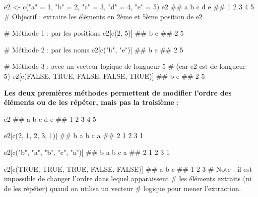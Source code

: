 \documentclass[12pt,twosided, notitlepage]{book}
\newenvironment{Shaded}{}{}
\newcommand{\KeywordTok}[1]{\textcolor[rgb]{0.00,0.00,1.00}{{#1}}}
\newcommand{\DecValTok}[1]{{#1}}
\newcommand{\StringTok}[1]{\textcolor[rgb]{0.00,0.50,0.50}{{#1}}}
\newcommand{\CommentTok}[1]{\textcolor[rgb]{0.00,0.50,0.00}{{#1}}}
\newcommand{\OtherTok}[1]{\textcolor[rgb]{1.00,0.25,0.00}{{#1}}}
\newcommand{\NormalTok}[1]{{#1}}
\renewenvironment{Shaded}{\begin{snugshade}}{\end{snugshade}}
\begin{document}
\begin{Shaded}
\begin{Highlighting}[]
\NormalTok{e2 <-}\StringTok{ }\KeywordTok{c}\NormalTok{(}\StringTok{"a"} \NormalTok{=}\StringTok{ }\DecValTok{1}\NormalTok{, }\StringTok{"b"} \NormalTok{=}\StringTok{ }\DecValTok{2}\NormalTok{, }\StringTok{"c"} \NormalTok{=}\StringTok{ }\DecValTok{3}\NormalTok{, }\StringTok{"d"} \NormalTok{=}\StringTok{ }\DecValTok{4}\NormalTok{, }\StringTok{"e"} \NormalTok{=}\StringTok{ }\DecValTok{5}\NormalTok{)}
\NormalTok{e2}
  \NormalTok{## a b c d e }
  \NormalTok{## 1 2 3 4 5}
\CommentTok{# Objectif : extraire les éléments en 2ème et 5ème position de e2}

\CommentTok{# Méthode 1 : par les positions}
\NormalTok{e2[}\KeywordTok{c}\NormalTok{(}\DecValTok{2}\NormalTok{, }\DecValTok{5}\NormalTok{)]}
  \NormalTok{## b e }
  \NormalTok{## 2 5}

\CommentTok{# Méthode 2 : par les noms}
\NormalTok{e2[}\KeywordTok{c}\NormalTok{(}\StringTok{"b"}\NormalTok{, }\StringTok{"e"}\NormalTok{)]}
  \NormalTok{## b e }
  \NormalTok{## 2 5}

\CommentTok{# Méthode 3 : avec un vecteur logique de longueur 5}
\CommentTok{# (car e2 est de longueur 5)}
\NormalTok{e2[}\KeywordTok{c}\NormalTok{(}\OtherTok{FALSE}\NormalTok{, }\OtherTok{TRUE}\NormalTok{, }\OtherTok{FALSE}\NormalTok{, }\OtherTok{FALSE}\NormalTok{, }\OtherTok{TRUE}\NormalTok{)]}
  \NormalTok{## b e }
  \NormalTok{## 2 5}
\end{Highlighting}
\end{Shaded}

\textbf{Les deux premières méthodes permettent de modifier l'ordre des
éléments ou de les répéter, mais pas la troisième} :

\begin{Shaded}
\begin{Highlighting}[]
\NormalTok{e2}
  \NormalTok{## a b c d e }
  \NormalTok{## 1 2 3 4 5}

\NormalTok{e2[}\KeywordTok{c}\NormalTok{(}\DecValTok{2}\NormalTok{, }\DecValTok{1}\NormalTok{, }\DecValTok{2}\NormalTok{, }\DecValTok{3}\NormalTok{, }\DecValTok{1}\NormalTok{)]}
  \NormalTok{## b a b c a }
  \NormalTok{## 2 1 2 3 1}

\NormalTok{e2[}\KeywordTok{c}\NormalTok{(}\StringTok{"b"}\NormalTok{, }\StringTok{"a"}\NormalTok{, }\StringTok{"b"}\NormalTok{, }\StringTok{"c"}\NormalTok{, }\StringTok{"a"}\NormalTok{)]}
  \NormalTok{## b a b c a }
  \NormalTok{## 2 1 2 3 1}

\NormalTok{e2[}\KeywordTok{c}\NormalTok{(}\OtherTok{TRUE}\NormalTok{, }\OtherTok{TRUE}\NormalTok{, }\OtherTok{TRUE}\NormalTok{, }\OtherTok{FALSE}\NormalTok{, }\OtherTok{FALSE}\NormalTok{)]}
  \NormalTok{## a b c }
  \NormalTok{## 1 2 3}
\CommentTok{# Note : il est impossible de changer l'ordre dans lequel apparaissent}
\CommentTok{# les éléments extraits (ni de les répéter) quand on utilise un vecteur}
\CommentTok{# logique pour mener l'extraction.}
\end{Highlighting}
\end{Shaded}
\end{document}

